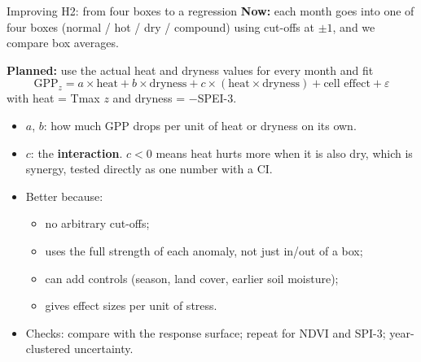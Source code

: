 \documentclass[11pt,aspectratio=169]{beamer}
\begin{document}
\begin{frame}{Improving H2: from four boxes to a regression}
  \footnotesize
  \textbf{Now:} each month goes into one of four boxes (normal / hot / dry
  / compound) using cut-offs at $\pm1$, and we compare box averages.

  \vspace{4pt}
  \textbf{Planned:} use the actual heat and dryness values for every month
  and fit
  \[
    \text{GPP}_z = a \times \text{heat} + b \times \text{dryness}
      + c \times (\text{heat} \times \text{dryness}) + \text{cell effect} + \varepsilon
  \]
  with heat = Tmax $z$ and dryness = $-$SPEI-3.
  \begin{itemize}
    \item $a$, $b$: how much GPP drops per unit of heat or dryness on its own.
    \item $c$: the \textbf{interaction}. $c < 0$ means heat hurts more when it
      is also dry, which is synergy, tested directly as one number with a CI.
    \item Better because:
      \begin{itemize}
        \item no arbitrary cut-offs;
        \item uses the full strength of each anomaly, not just in/out of a box;
        \item can add controls (season, land cover, earlier soil moisture);
        \item gives effect sizes per unit of stress.
      \end{itemize}
    \item Checks: compare with the response surface; repeat for NDVI and SPI-3;
      year-clustered uncertainty.
  \end{itemize}
\end{frame}
\end{document}
